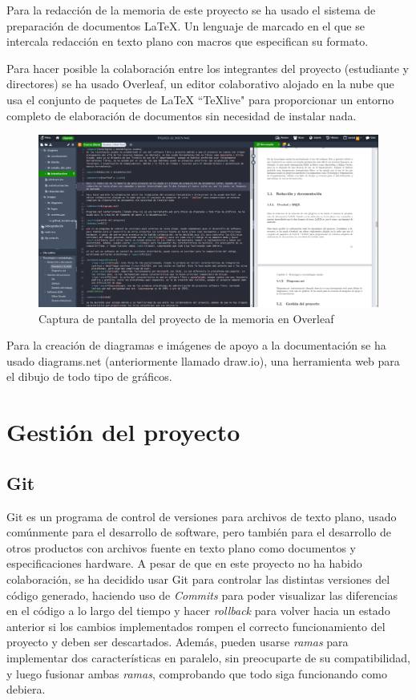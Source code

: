 Para la redacción de la memoria de este proyecto se ha usado el sistema de preparación de documentos \LaTeX. Un lenguaje de marcado en el que se intercala redacción en texto plano con macros que especifican su formato.

Para hacer posible la colaboración entre los integrantes del proyecto (estudiante y directores) se ha usado Overleaf, un editor colaborativo alojado en la nube que usa el conjunto de paquetes de LaTeX ``TeXlive" para proporcionar un entorno completo de elaboración de documentos sin necesidad de instalar nada.

\begin{figure}[h]
    \centering
    \includegraphics[width=\linewidth]{images/screencaps/overleaf.png}
    \caption{Captura de pantalla del proyecto de la memoria en Overleaf}
    \label{fig:screencap_overleaf}
\end{figure}

Para la creación de diagramas e imágenes de apoyo a la documentación se ha usado diagrams.net (anteriormente llamado draw.io), una herramienta web para el dibujo de todo tipo de gráficos.

\section{Gestión del proyecto}
\subsection{Git}

Git es un programa de control de versiones para archivos de texto plano, usado comúnmente para el desarrollo de software, pero también para el desarrollo de otros productos con archivos fuente en texto plano como documentos y especificaciones hardware. A pesar de que en este proyecto no ha habido colaboración, se ha decidido usar Git para controlar las distintas versiones del código generado, haciendo uso de \textit{Commits} para poder visualizar las diferencias en el código a lo largo del tiempo y hacer \textit{rollback} para volver hacia un estado anterior si los cambios implementados rompen el correcto funcionamiento del proyecto y deben ser descartados. Además, pueden usarse \textit{ramas} para implementar dos características en paralelo, sin preocuparte de su compatibilidad, y luego fusionar ambas \textit{ramas}, comprobando que todo siga funcionando como debiera.

